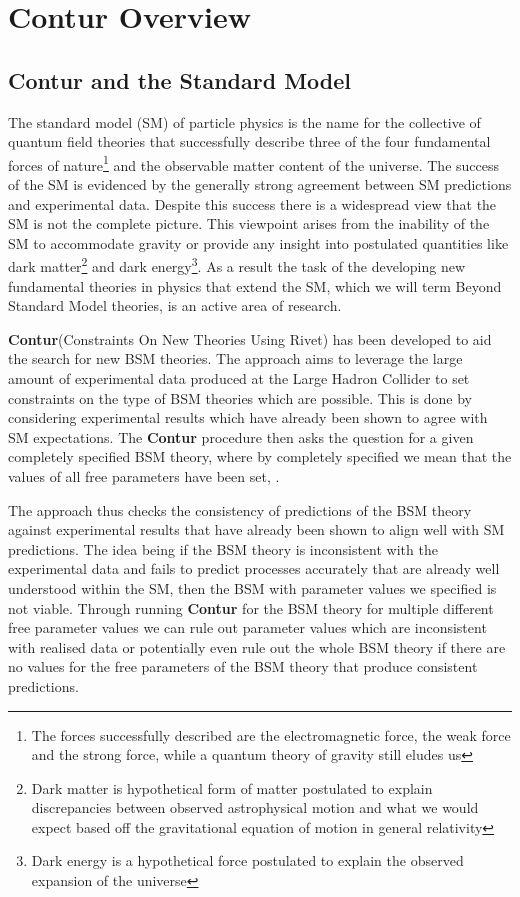 \chapter{Contur Overview}
\label{chapterlabel2}

\section{Contur and the Standard Model}
The standard model (SM) of particle physics is the name for the collective of quantum field theories that successfully describe three of the four fundamental forces of nature\footnote{The forces successfully described are the electromagnetic force, the weak force and the strong force, while a quantum theory of gravity still eludes us} and the observable matter content of the universe. The success of the SM is evidenced by the generally strong agreement between SM predictions and experimental data. Despite this success there is a widespread view that the SM is not the complete picture. This viewpoint arises from the inability of the SM to accommodate gravity or provide any insight into postulated quantities like dark matter\footnote{Dark matter is hypothetical form of matter postulated to explain discrepancies between observed astrophysical motion and what we would expect based off the gravitational equation of motion in general relativity} and dark energy\footnote{Dark energy is a hypothetical force postulated to explain the observed expansion of the universe}. As a result the task of the developing new fundamental theories in physics that extend the SM, which we will term Beyond Standard Model theories, is an active area of research.

\textbf{Contur}(Constraints On New Theories Using Rivet) has been developed to aid the search for new BSM theories. The approach aims to leverage the large amount of experimental data produced at the Large Hadron Collider to set constraints on the type of BSM theories which are possible. This is done by considering experimental results which have already been shown to agree with SM expectations. The \textbf{Contur} procedure then asks  the question for a given completely specified BSM theory, where by completely specified we mean that the values of all free parameters have been set, . 

The approach thus checks the consistency of predictions of the BSM theory against experimental results that have already been shown to align well with SM predictions. The idea being if the BSM theory is inconsistent with the experimental data and fails to predict processes accurately that are already well understood within the SM, then the BSM with parameter values we specified is not viable. Through running \textbf{Contur} for the BSM theory for multiple different free parameter values we can rule out parameter values which are inconsistent with realised data or potentially even rule out the whole BSM theory if there are no values for the free parameters of the BSM theory that produce consistent predictions.

